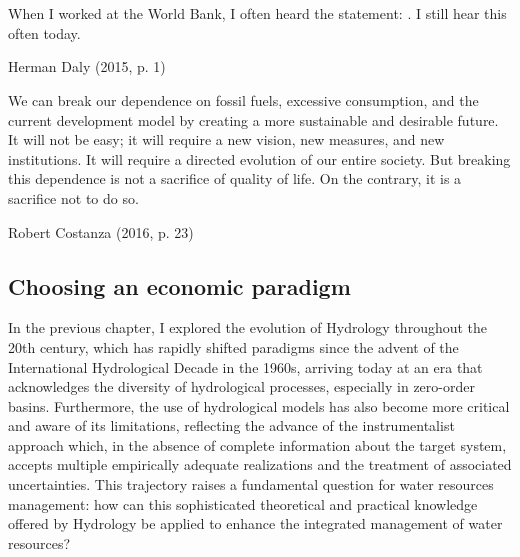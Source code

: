 \documentclass[./main_en.tex]{subfiles}
\begin{document}
\chapter{\chapEcoEn} \label{chap:ecoeco}

\setlength{\parskip}{0mm}

\epigraph{\small{When I worked at the World Bank, I often heard the statement: . I still hear this often today.}}{Herman Daly (2015, p. 1) \cite{Daly2015a}}

\epigraph{\small{We can break our dependence on fossil fuels, excessive consumption, and the current development model by creating a more sustainable and desirable future. It will not be easy; it will require a new vision, new measures, and new institutions. It will require a directed evolution of our entire society. But breaking this dependence is not a sacrifice of quality of life. On the contrary, it is a sacrifice not to do so.}}{Robert Costanza (2016, p. 23) \cite{potschin2016}}


\setlength{\parskip}{\myparskip}

\section{Choosing an economic paradigm} \label{chap:ecoeco:sec1}

\par In the previous chapter, I explored the evolution of Hydrology throughout the 20th century, which has rapidly shifted paradigms since the advent of the International Hydrological Decade in the 1960s, arriving today at an era that acknowledges the diversity of hydrological processes, especially in zero-order basins. Furthermore, the use of hydrological models has also become more critical and aware of its limitations, reflecting the advance of the instrumentalist approach which, in the absence of complete information about the target system, accepts multiple empirically adequate realizations and the treatment of associated uncertainties. This trajectory raises a fundamental question for water resources management: how can this sophisticated theoretical and practical knowledge offered by Hydrology be applied to enhance the integrated management of water resources?
\end{document}
